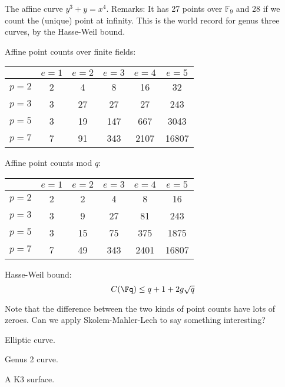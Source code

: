 The affine curve $y^3 + y = x^4$. Remarks: It has 27 points over $\mathbb{F}_9$ and 28 if we count the (unique) point at infinity. This is the world record for genus three curves, by the Hasse-Weil bound. 

Affine point counts over finite fields:
\begin{table}[h]
\centering
\begin{tabular}{| l | | c | c | c | c | c |}
\hline
& $e = 1$ & $e = 2$ & $e = 3$ & $e = 4$ & $e = 5$\\
\hline
\hline
$p = 2$ & 2 & 4 & 8 & 16 & 32 \\
\hline
$p = 3$ & 3 & 27 & 27 & 27 & 243 \\
\hline
$p = 5$ & 3 & 19 & 147 & 667 & 3043 \\
\hline
$p = 7$ & 7 & 91 & 343 & 2107 & 16807 \\
\hline
\end{tabular}
\end{table}

Affine point counts mod $q$:
\begin{table}[h]
\centering
\begin{tabular}{| l | | c | c | c | c | c |}
\hline
& $e = 1$ & $e = 2$ & $e = 3$ & $e = 4$ & $e = 5$\\
\hline
\hline
$p = 2$ & 2 & 2 & 4 & 8 & 16 \\
\hline
$p = 3$ & 3 & 9 & 27 & 81 & 243 \\
\hline
$p = 5$ & 3 & 15 & 75 & 375 & 1875 \\
\hline
$p = 7$ & 7 & 49 & 343 & 2401 & 16807 \\
\hline
\end{tabular}
\end{table}

Hasse-Weil bound: 
$$ C(\Fq) \leq q + 1 + 2 g \sqrt{q}  $$

Note that the difference between the two kinds of point counts have lots of zeroes. Can we apply Skolem-Mahler-Lech to say something interesting?
\begin{example}
Elliptic curve.

\end{example}


\begin{example}
Genus 2 curve.

\end{example}


\begin{example}
A K3 surface.

\end{example}


